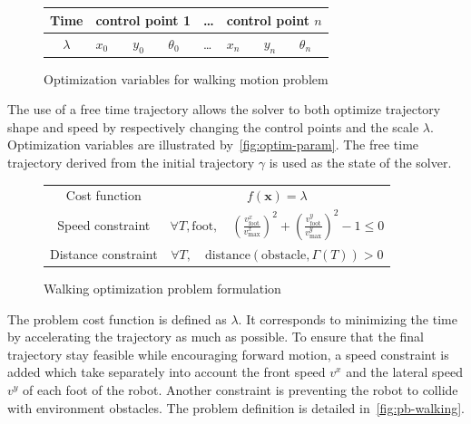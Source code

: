 \documentclass[conference,final,a4paper,twocolumn,9pt]{IEEEtran}
\begin{document}
\begin{figure}
  \begin{center}
    \begin{tabular}{|c|l l l| l |l l l|}
      \hline
      Time
      & \multicolumn{3}{|c|}{control point 1}
      & \ldots
      & \multicolumn{3}{|c|}{control point $n$}\\
      \hline
      $\lambda$
      & $x_0$ & $y_0$ & $\theta_0$
      & \ldots
      & $x_n$ & $y_n$ & $\theta_n$\\
      \hline
    \end{tabular}
  \end{center}
  \caption{Optimization variables for walking motion problem\label{fig:optim-param}}
\end{figure}


The use of a free time trajectory allows the solver to both optimize
trajectory shape and speed by respectively changing the control points
and the scale $\lambda$. Optimization variables are illustrated
by~\autoref{fig:optim-param}. The free time trajectory derived from
the initial trajectory $\gamma$ is used as the state of the solver.


\begin{figure}
  \begin{center}
    \begin{tabular}{|c|c|}
      \hline Cost function & $f(\mathbf{x}) = \lambda$\\ Speed
      constraint & $\forall T, \text{foot},\quad
      (\frac{v_{\text{foot}}^{x}}{v_{\text{max}}^{x}})^2 +
      (\frac{v_{\text{foot}}^{y}}{v_{\text{max}}^{y}})^2 - 1 \leq
      0$\\ Distance constraint & $\forall T,\quad\text{distance} (\text{obstacle},
      \Gamma (T)) > 0$\\ \hline
    \end{tabular}
    \caption{Walking optimization problem formulation\label{fig:pb-walking}}
  \end{center}
\end{figure}


The problem cost function is defined as $\lambda$. It corresponds to
minimizing the time by accelerating the trajectory as much as
possible. To ensure that the final trajectory stay feasible while
encouraging forward motion, a speed constraint is added which take
separately into account the front speed $v^x$ and the lateral speed
$v^y$ of each foot of the robot. Another constraint is preventing the
robot to collide with environment obstacles. The problem definition is
detailed in~\autoref{fig:pb-walking}.
\end{document}
